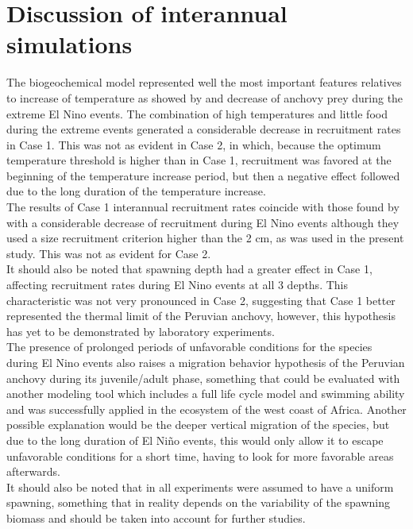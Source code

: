 \clearpage
\section{Discussion of interannual simulations}\label{Chap3Disc2}

The biogeochemical model represented well the most important features relatives to increase of temperature as showed by \citep{ColaCape2008} and decrease of anchovy prey \citep{AyonSwar2011} during the extreme El Nino events. The combination of high temperatures and little food during the extreme events generated a considerable decrease in recruitment rates in Case 1. This was not as evident in Case 2, in which, because the optimum temperature threshold is higher than in Case 1, recruitment was favored at the beginning of the temperature increase period, but then a negative effect followed due to the long duration of the temperature increase.\\

The results of Case 1 interannual recruitment rates coincide with those found by \cite{XuChai2013} with a considerable decrease of recruitment during El Nino events although they used a size recruitment criterion higher than the 2 cm, as was used in the present study. This was not as evident for Case 2.\\

It should also be noted that spawning depth had a greater effect in Case 1, affecting recruitment rates during El Nino events at all 3 depths. This characteristic was not very pronounced in Case 2, suggesting that Case 1 better represented the thermal limit of the Peruvian anchovy, however, this hypothesis has yet to be demonstrated by laboratory experiments.\\

The presence of prolonged periods of unfavorable conditions for the species during El Nino events also raises a migration behavior hypothesis of the Peruvian anchovy during its juvenile/adult phase, something that could be evaluated with another modeling tool \citep{BrocAuge2018} which includes a full life cycle model and swimming ability and was successfully applied in the ecosystem of the west coast of Africa. Another possible explanation would be the deeper vertical migration of the species, but due to the long duration of El Niño events, this would only allow it to escape unfavorable conditions for a short time, having to look for more favorable areas afterwards.\\

It should also be noted that in all experiments were assumed to have a uniform spawning, something that in reality depends on the variability of the spawning biomass \citep{CahuCubi2009} and should be taken into account for further studies.

\clearpage
